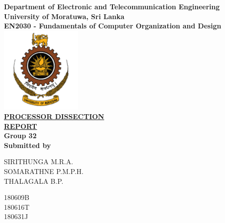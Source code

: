 \begin{titlepage}
\center %

\textbf{\large Department of Electronic and Telecommunication Engineering}\\[0.5cm]
\textbf{\Large University of Moratuwa, Sri Lanka}\\[1cm]
\textbf{\large EN2030 - Fundamentals of Computer Organization and Design}\\[2cm]
\includegraphics[width=0.3\textwidth]{uomlogo.png}\\[2cm]

	
\textbf{\Huge\underline {PROCESSOR DISSECTION}  }\\[2mm]
\textbf{\Huge\underline{REPORT}}\\[0.5cm]
\textbf{\Large Group 32}\\[5cm]



\textbf{\large Submitted by}\\[0.5cm]
\begin{minipage}{0.32\textwidth}
	\begin{flushleft}
		{\large SIRITHUNGA M.R.A.	}\\[4mm]
		{\large SOMARATHNE P.M.P.H.	}\\[4mm]
		{\large THALAGALA B.P.		}\\[4mm]
	\end{flushleft}
\end{minipage}
\hspace{5mm}
\begin{minipage}{0.32\textwidth}
	\begin{flushright}
		{\large 180609B  }\\[4mm]
		{\large 180616T  }\\[4mm]
		{\large 180631J  }\\[4mm]
	\end{flushright}
\end{minipage}\\[2cm]



\end{titlepage}
